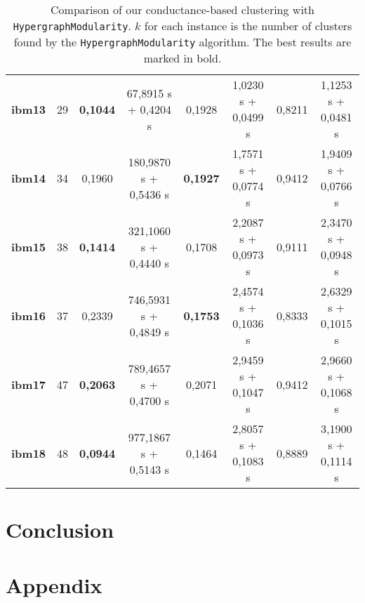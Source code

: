 \documentclass[acmsmall,nonacm,screen,review]{acmart}
\begin{document}
\begin{table}[!ht]
\begin{tabular}{|c|c|c|c|c|c|c|c|}
\textbf{ibm13} & 29         & \textbf{0,1044} & 67,8915 s + 0,4204 s  & 0,1928 & 1,0230 s + 0,0499 s & 0,8211 & 1,1253 s + 0,0481 s  \\ 
\textbf{ibm14} & 34         & 0,1960 & 180,9870 s + 0,5436 s & \textbf{0,1927} & 1,7571 s + 0,0774 s & 0,9412 & 1,9409 s + 0,0766 s  \\ 
\textbf{ibm15} & 38         & \textbf{0,1414} & 321,1060 s + 0,4440 s & 0,1708 & 2,2087 s + 0,0973 s & 0,9111 & 2,3470 s + 0,0948 s  \\ 
\textbf{ibm16} & 37         & 0,2339 & 746,5931 s + 0,4849 s & \textbf{0,1753} & 2,4574 s + 0,1036 s & 0,8333 & 2,6329 s + 0,1015 s  \\ 
\textbf{ibm17} & 47         & \textbf{0,2063} & 789,4657 s + 0,4700 s & 0,2071 & 2,9459 s + 0,1047 s & 0,9412 & 2,9660 s + 0,1068 s  \\ 
\textbf{ibm18} & 48         & \textbf{0,0944} & 977,1867 s + 0,5143 s & 0,1464 & 2,8057 s + 0,1083 s & 0,8889 & 3,1900 s + 0,1114 s  \\ \hline
    \end{tabular}
    \caption{Comparison of our conductance-based clustering with \texttt{HypergraphModularity}. 
    $k$ for each instance is the number of clusters found by the \texttt{HypergraphModularity} 
    algorithm. The best results are marked in bold.}
\end{table}


\section{Conclusion}
\label{sec:conclusion}

\appendix
\section{Appendix}
\label{appendix:a}
\end{document}
